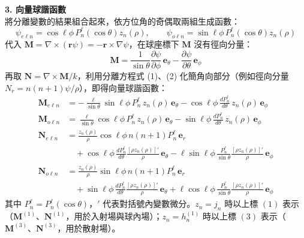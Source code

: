 \textbf{3. 向量球諧函數}\\
將分離變數的結果組合起來，依方位角的奇偶取兩組生成函數：
\begin{equation}
    \psi_{e\ell n} = \cos\ell\phi\, P_n^{\ell}\left(\cos\theta\right) z_n\left(\rho\right), \qquad \psi_{o\ell n} = \sin\ell\phi\, P_n^{\ell}\left(\cos\theta\right) z_n\left(\rho\right)
\end{equation}
代入 $\mathbf{M} = \nabla \times (\mathbf{r}\psi) = -\mathbf{r} \times \nabla\psi$，在球座標下 $\mathbf{M}$ 沒有徑向分量：
\begin{equation}
    \mathbf{M} = \frac{1}{\sin\theta} \frac{\partial \psi}{\partial \phi}\, \mathbf{e}_{\theta} - \frac{\partial \psi}{\partial \theta}\, \mathbf{e}_{\phi}
\end{equation}
再取 $\mathbf{N} = \nabla \times \mathbf{M} / k$，利用分離方程式 (1)、(2) 化簡角向部分（例如徑向分量 $N_r = n(n+1)\psi / \rho$），即得向量球諧函數：
\begin{align}
    \mathbf{M}_{e\ell n} &= -\frac{\ell}{\sin\theta} \sin\ell\phi\, P_n^{\ell}\, z_n(\rho)\, \mathbf{e}_{\theta} - \cos\ell\phi\, \frac{dP_n^{\ell}}{d\theta}\, z_n(\rho)\, \mathbf{e}_{\phi} \\
    \mathbf{M}_{o\ell n} &= \frac{\ell}{\sin\theta} \cos\ell\phi\, P_n^{\ell}\, z_n(\rho)\, \mathbf{e}_{\theta} - \sin\ell\phi\, \frac{dP_n^{\ell}}{d\theta}\, z_n(\rho)\, \mathbf{e}_{\phi} \\
    \mathbf{N}_{e\ell n} &= \frac{z_n(\rho)}{\rho} \cos\ell\phi\, n(n+1) P_n^{\ell}\, \mathbf{e}_r  \\
    &\quad + \cos\ell\phi\, \frac{dP_n^{\ell}}{d\theta} \frac{\left[\rho z_n(\rho)\right]'}{\rho}\, \mathbf{e}_{\theta} - \ell \sin\ell\phi\, \frac{P_n^{\ell}}{\sin\theta} \frac{\left[\rho z_n(\rho)\right]'}{\rho}\, \mathbf{e}_{\phi} \\
    \mathbf{N}_{o\ell n} &= \frac{z_n(\rho)}{\rho} \sin\ell\phi\, n(n+1) P_n^{\ell}\, \mathbf{e}_r  \\
    &\quad + \sin\ell\phi\, \frac{dP_n^{\ell}}{d\theta} \frac{\left[\rho z_n(\rho)\right]'}{\rho}\, \mathbf{e}_{\theta} + \ell \cos\ell\phi\, \frac{P_n^{\ell}}{\sin\theta} \frac{\left[\rho z_n(\rho)\right]'}{\rho}\, \mathbf{e}_{\phi}
\end{align}
其中 $P_n^{\ell} = P_n^{\ell}\left(\cos\theta\right)$，$'$ 代表對括號內變數微分。$z_n = j_n$ 時以上標 $(1)$ 表示（$\mathbf{M}^{(1)}$、$\mathbf{N}^{(1)}$，用於入射場與球內場）；$z_n = h_n^{(1)}$ 時以上標 $(3)$ 表示（$\mathbf{M}^{(3)}$、$\mathbf{N}^{(3)}$，用於散射場）。

